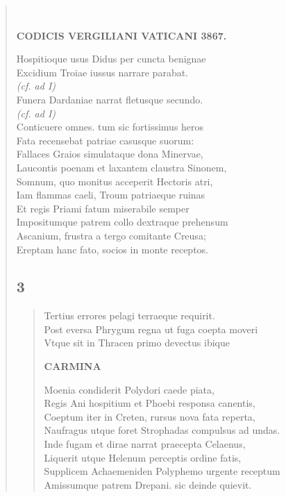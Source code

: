 \documentclass[11pt, a4paper]{report}
\begin{document}
\begin{verse}
        ﻿\pagebreak 
    
                    \begin{center} \textbf{CODICIS VERGILIANI VATICANI 3867.} \end{center}
                    Hospitioque usus Didus per cuncta benignae \\ 
                    Excidium Troiae iussus narrare parabat. \\ 
                
                    \textit{(cf. ad I)} \\ 
                    Funera Dardaniae narrat fletusque secundo. \\ 
                    \textit{(cf. ad I)} \\ 
                    Conticuere omnes. tum sic fortissimus heros \\ 
                    Fata recensebat patriae casusque suorum: \\ 
                    Fallaces Graios simulataque dona Minervae, \\ 
                    Laucontis poenam et laxantem claustra Sinonem, \\ 
                    Somnum, quo monitus acceperit Hectoris atri, \\ 
                    Iam flammas caeli, Troum patriaeque ruinas \\ 
                    Et regis Priami fatum miserabile semper \\ 
                    Impositumque patrem collo dextraque prehensum \\ 
                    Ascanium, frustra a tergo comitante Creusa; \\ 
                    Ereptam hanc fato, socios in monte receptos. \\ 
                \subsection*{3}
      \begin{verse}
      Tertius errores pelagi terraeque requirit. \\ Post eversa Phrygum regna ut fuga coepta moveri \\ Vtque sit in Thracen primo devectus ibique \\ \begin{center} \textbf{CARMINA} \end{center} \marginpar{[10]} Moenia condiderit Polydori caede piata, \\ Regis Ani hospitium et Phoebi responsa canentis, \\ Coeptum iter in Creten, rursus nova fata reperta, \\ Naufragus utque foret Strophadas compulsus ad undas. \\ Inde fugam et dirae narrat praecepta Celaenus, \\ Liquerit utque Helenum perceptis ordine fatis, \\ Supplicem Achaemeniden Polyphemo urgente receptum \\ Amissumque patrem Drepani. sic deinde quievit. \\ 
      \end{verse}

\end{verse}
\end{document}
